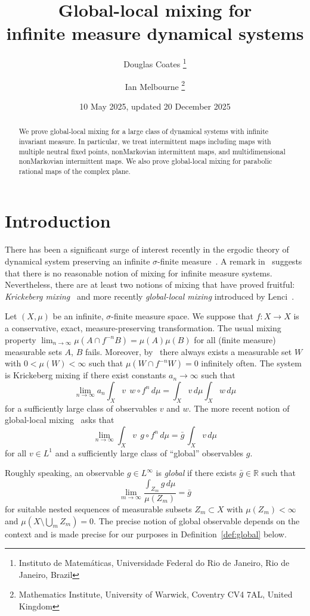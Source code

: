 \documentclass[12pt]{article}
\title{Global-local mixing for \\ infinite measure dynamical systems}
\author{
  Douglas Coates
  \thanks{Instituto de Matemáticas, Universidade Federal do Rio de Janeiro, Rio de Janeiro, Brazil}
  \and
  Ian Melbourne
  \thanks{Mathematics Institute, University of Warwick, Coventry CV4 7AL, United Kingdom}
}
\date{10 May 2025, updated 20 December 2025}
\numberwithin{equation}{section}
\newcommand{\R}{{\mathbb R}}
\begin{document}
\maketitle

 \begin{abstract}
We prove global-local mixing for a large class of dynamical systems with infinite invariant measure. In particular, we treat
intermittent maps including maps with multiple neutral fixed points, nonMarkovian intermittent maps, and multidimensional nonMarkovian intermittent maps.
We also prove global-local mixing for parabolic rational maps of the complex plane.
 \end{abstract}


\section{Introduction}


There has been a significant surge of interest recently in the ergodic theory of dynamical system preserving an infinite $\sigma$-finite measure~\cite{Aaronson}.
A remark in~\cite[p.~75]{Aaronson} suggests that there is no reasonable notion of mixing for infinite measure systems. Nevertheless, there are at least two notions of mixing that have proved fruitful: \emph{Krickeberg mixing}~\cite{Krickeberg67} and more recently \emph{global-local mixing} introduced by Lenci~\cite{Lenci10}.

Let $(X,\mu)$ be an infinite, $\sigma$-finite measure space.  We suppose that 
$f:X\to X$ is a conservative, exact, measure-preserving transformation.
The usual mixing property $\lim_{n\to\infty}\mu(A\cap f^{-n}B)=\mu(A)\mu(B)$ for all (finite measure) measurable sets $A$, $B$ fails.
Moreover, by~\cite{HajianKakutani64} there always exists a measurable set $W$
with $0<\mu(W)<\infty$ such that
$\mu(W\cap f^{-n}W)=0$ infinitely often.
The system is Krickeberg mixing if there exist constants $a_n\to\infty$ such that 
\[
\lim_{n\to\infty}a_n\int_X v\;\,w\circ f^n\,d\mu=\int_X v\,d\mu\int_X w\,d\mu
\]
for a sufficiently large class of observables $v$ and $w$.
The more recent notion of global-local mixing~\cite{Lenci10} asks that
\begin{equation} \label{eq:glocal}
\lim_{n\to\infty}\int_X v\;\,g\circ f^n\,d\mu=\bar g\,\int_X v\,d\mu
\end{equation}
for all $v\in L^1$ and a sufficiently large class of ``global'' observables $g$.

Roughly speaking, an observable $g\in L^\infty$ is \emph{global} if
there exists $\bar g\in\R$ such that
\[
\lim_{m\to\infty}\frac{\int_{Z_m} g\,d\mu}{\mu(Z_m)}= \bar g
\]
for suitable nested sequences of measurable subsets $Z_m\subset X$
	with $\mu(Z_m)<\infty$ and $\mu(X\setminus \bigcup_m Z_m)=0$.
The precise notion of global observable depends on the context and is made precise for our purposes in Definition~\ref{def:global} below.
\end{document}
